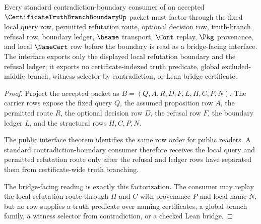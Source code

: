 \begin{theorem}
\label{thm:certificatetruthbranchboundary-bridge-interface}
Every standard contradiction-boundary consumer of an accepted $\CertificateTruthBranchBoundaryUp$ packet must factor through the fixed local query row, permitted refutation route, optional decision row, truth-branch refusal row, boundary ledger, $\hsame$ transport, $\Cont$ replay, $\Pkg$ provenance, and local $\NameCert$ row before the boundary is read as a bridge-facing interface. The interface exports only the displayed local refutation boundary and the refusal ledger; it exports no certificate-indexed truth predicate, global excluded-middle branch, witness selector by contradiction, or Lean bridge certificate.
\end{theorem}
\begin{proof}
Project the accepted packet as $B=(Q,A,R,D,F,L,H,C,P,N)$. The carrier rows expose the fixed query $Q$, the assumed proposition row $A$, the permitted route $R$, the optional decision row $D$, the refusal row $F$, the boundary ledger $L$, and the structural rows $H,C,P,N$.

The public interface theorem identifies the same row order for public readers. A standard contradiction-boundary consumer therefore receives the local query and permitted refutation route only after the refusal and ledger rows have separated them from certificate-wide truth branching.

The bridge-facing reading is exactly this factorization. The consumer may replay the local refutation route through $H$ and $C$ with provenance $P$ and local name $N$, but no row supplies a truth predicate over naming certificates, a global branch family, a witness selector from contradiction, or a checked Lean bridge.
\end{proof}

